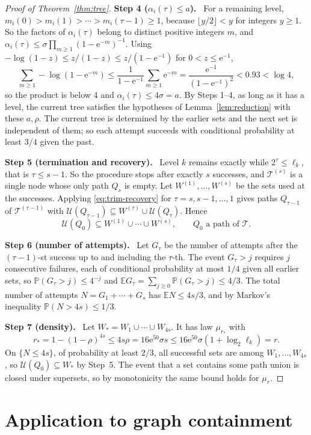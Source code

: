 \documentclass[11pt]{article}
\numberwithin{equation}{section}
\newcommand{\PP}{\mathbb P}
\newcommand{\EE}{\mathbb E}
\newcommand{\TT}{\mathcal T}
\newcommand{\UU}{\mathcal U}
\newcommand{\ee}{\mathrm e}
\newcommand{\step}[1]{\par\smallskip\noindent\textbf{Step #1.}\ }
\begin{document}
\begin{proof}[Proof of Theorem~\ref{thm:tree}]
\step{4 ($\alpha_i(\tau)\le a$)} For a remaining level,
$m_i(0)>m_i(1)>\cdots>m_i(\tau-1)\ge1$, because
$\lfloor y/2\rfloor<y$ for integers $y\ge1$. So the factors of
$\alpha_i(\tau)$ belong to distinct positive integers $m$, and
$\alpha_i(\tau)\le\sigma\prod_{m\ge1}(1-\ee^{-m})^{-1}$. Using
$-\log(1-z)\le z/(1-z)\le z/(1-\ee^{-1})$ for $0<z\le\ee^{-1}$,
\[
 \sum_{m\ge1}-\log(1-\ee^{-m})
 \le\frac1{1-\ee^{-1}}\sum_{m\ge1}\ee^{-m}
 =\frac{\ee^{-1}}{(1-\ee^{-1})^2}<0.93<\log4,
\]
so the product is below $4$ and $\alpha_i(\tau)\le4\sigma=a$. By Steps
1--4, as long as it has a level, the current tree satisfies the
hypotheses of Lemma~\ref{lem:reduction} with these $a,\rho$. The current
tree is determined by the earlier sets and the next set is independent of
them; so each attempt succeeds with conditional probability at least
$3/4$ given the past.

\step{5 (termination and recovery)} Level $k$ remains exactly while
$2^\tau\le\ell_k$, that is $\tau\le s-1$. So the procedure stops after
exactly $s$ successes, and $\TT^{(s)}$ is a single node whose only path
$Q_s$ is empty. Let $W^{(1)},\ldots,W^{(s)}$ be the sets used at the
successes. Applying \eqref{eq:trim-recovery} for $\tau=s,s-1,\ldots,1$
gives paths $Q_{\tau-1}$ of $\TT^{(\tau-1)}$ with
$\UU(Q_{\tau-1})\subseteq W^{(\tau)}\cup\UU(Q_\tau)$. Hence
\[
 \UU(Q_0)\subseteq W^{(1)}\cup\cdots\cup W^{(s)},
 \qquad Q_0\text{ a path of }\TT.
\]

\step{6 (number of attempts)} Let $G_\tau$ be the number of attempts
after the $(\tau-1)$-st success up to and including the $\tau$-th. The
event $G_\tau>j$ requires $j$ consecutive failures, each of conditional
probability at most $1/4$ given all earlier sets, so
$\PP(G_\tau>j)\le4^{-j}$ and
$\EE G_\tau=\sum_{j\ge0}\PP(G_\tau>j)\le4/3$. The total number of
attempts $N=G_1+\cdots+G_s$ has $\EE N\le4s/3$, and by Markov's
inequality $\PP(N>4s)\le1/3$.

\step{7 (density)} Let $W_*=W_1\cup\cdots\cup W_{4s}$. It has law
$\mu_{r_*}$ with
\[
 r_*=1-(1-\rho)^{4s}\le4s\rho=16\ee^{50}\sigma s
 \le16\ee^{50}\sigma(1+\log_2\ell_k)=r.
\]
On $\{N\le4s\}$, of probability at least $2/3$, all successful sets are
among $W_1,\ldots,W_{4s}$, so $\UU(Q_0)\subseteq W_*$ by Step~5. The
event that a set contains some path union is closed under supersets, so
by monotonicity the same bound holds for $\mu_r$.
\end{proof}

\section{Application to graph containment}\label{sec:graphs}
\end{document}
